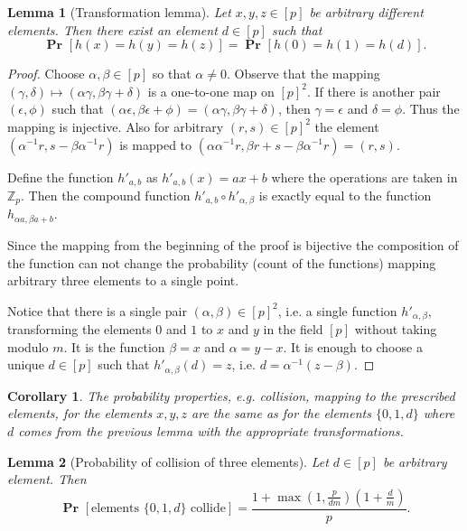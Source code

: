 \documentclass{article}
\newcommand{\probs}[2]{\operatorname{\mathbf{Pr}}_{{#1}}\left[{#2}\right]}
\newcommand{\prob}[1]{\probs{}{#1}}
\newtheorem{lemma}{Lemma}
\newtheorem{corollary}{Corollary}
\begin{document}
\begin{lemma}[Transformation lemma]
Let $x, y, z \in [p]$ be arbitrary different elements. Then there exist an element $d \in [p]$ such that
\[
\prob{h(x) = h(y) = h(z)} = \prob{h(0) = h(1) = h(d)}.
\]
\end{lemma}
\begin{proof}
Choose $\alpha, \beta \in [p]$ so that $\alpha \neq 0$.
Observe that the mapping $(\gamma, \delta) \mapsto (\alpha \gamma, \beta \gamma + \delta)$ is a one-to-one map on $[p]^2$.
If there is another pair $(\epsilon, \phi)$ such that $(\alpha \epsilon, \beta \epsilon + \phi) = (\alpha \gamma, \beta \gamma + \delta)$, then $\gamma = \epsilon$ and $\delta = \phi$. Thus the mapping is injective.
Also for arbitrary $(r, s) \in [p]^2$ the element $(\alpha^{-1}r, s - \beta\alpha^{-1}r)$ is mapped to $(\alpha \alpha^{-1}r, \beta r + s - \beta\alpha^{-1}r) = (r, s)$.

Define the function $h'_{a, b}$ as $h'_{a, b}(x) = ax + b$ where the operations are taken in $\mathbb{Z}_p$. Then the compound function $h'_{a, b} \circ h'_{\alpha, \beta}$ is exactly equal to the function $h_{\alpha a, \beta a + b}$.

Since the mapping from the beginning of the proof is bijective the composition of the function can not change the probability (count of the functions) mapping arbitrary three elements to a single point.

Notice that there is a single pair $(\alpha, \beta) \in [p] ^ 2$, i.e. a single function $h'_{\alpha, \beta}$, transforming the elements $0$ and $1$ to $x$ and $y$ in the field $[p]$ without taking modulo $m$. It is the function $\beta = x$ and $\alpha = y - x$.
It is enough to choose a unique $d \in [p]$ such that $h'_{\alpha, \beta}(d) = z$, i.e. $d = \alpha ^ {-1}(z - \beta)$.
\end{proof}

\begin{corollary}
The probability properties, e.g. collision, mapping to the prescribed elements, for the elements $x, y, z$ are the same as for the elements $\{0, 1, d\}$ where $d$ comes from the previous lemma with the appropriate transformations.
\end{corollary}

\begin{lemma}[Probability of collision of three elements]
Let $d \in [p]$ be arbitrary element. Then
\[
\prob{\mbox{elements }\{0, 1, d\}\mbox{ collide}} = 
\frac{1 + \max\left(1, \frac{p}{dm}\right)\left(1 + \frac{d}{m}\right)}{p}.
\]
\end{lemma}
\end{document}
